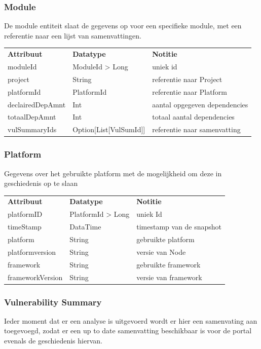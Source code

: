 \subsubsection{Module}\label{subsubsec:portalModule}
De module entiteit slaat de gegevens op voor een specifieke module, met een referentie naar een lijst van samenvattingen.

\begin{tabular}{lll}
    \textbf{Attribuut} & \textbf{Datatype} & \textbf{Notitie}\\
    moduleId & ModuleId > Long & uniek id \\
    project & String & referentie naar Project\\
    platformId & PlatformId & referentie naar Platform\\
    declairedDepAmnt & Int & aantal opgegeven dependencies\\
    totaalDepAmnt & Int & totaal aantal dependencies\\
    vulSummaryIds & Option[List[VulSumId]]& referentie naar samenvatting\\
\end{tabular}
\subsubsection{Platform}\label{subsubsec:Platform}
Gegevens over het gebruikte platform met de mogelijkheid om deze in geschiedenis op te slaan

\begin{tabular}{lll}
    \textbf{Attribuut} & \textbf{Datatype} & \textbf{Notitie}\\
    platformID & PlatformId > Long & uniek Id\\
    timeStamp & DataTime & timestamp van de snapshot\\
    platform & String & gebruikte platform \\
    platformversion & String & versie van Node  \\
    framework & String &  gebruikte framework  \\
    frameworkVersion & String & versie van framework  \\
\end{tabular}


\subsubsection{Vulnerability Summary}\label{subsubsec:portalVulSum}
Ieder moment dat er een analyse is uitgevoerd wordt er hier een samenvating aan toegevoegd, zodat er een up to date samenvatting beschikbaar is voor de portal evenals de geschiedenis hiervan.

